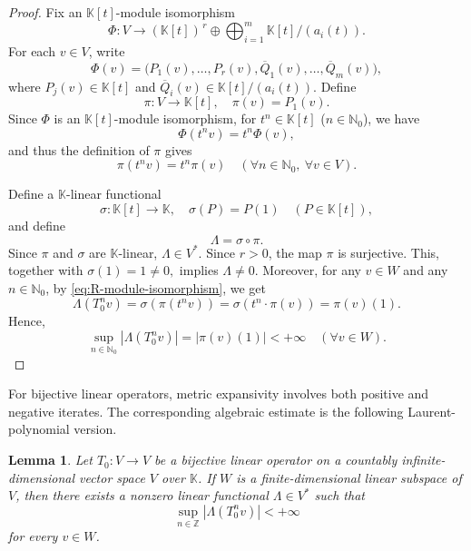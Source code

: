 \documentclass[11pt]{amsart}
\newtheorem{lemma}{Lemma}
\theoremstyle{definition}
\theoremstyle{remark}
\theoremstyle{plain}
\begin{document}
\begin{proof}
Fix an \(\mathbb{K}[t]\)-module isomorphism
\[
\Phi:V\to (\mathbb{K}[t])^{\,r}
\oplus
\bigoplus_{i=1}^{m}\mathbb{K}[t]\big/(a_i(t)).
\]
For each \(v\in V\), write
\[
\Phi(v)=
\big(P_1(v),\ldots,P_r(v),
\overline{Q}_1(v),\ldots,\overline{Q}_m(v)\big),
\]
where \(P_j(v)\in\mathbb{K}[t]\) and
\(\overline{Q}_i(v)\in\mathbb{K}[t]\big/(a_i(t))\).
Define
\[
\pi:V\to\mathbb{K}[t],
\quad
\pi(v)=P_1(v).
\]
Since \(\Phi\) is an \(\mathbb{K}[t]\)-module isomorphism,
for $t^{n}\in \mathbb{K}[t]$ ($n\in \mathbb{N}_0$), we have
\[
\Phi(t^n v)=t^n\Phi(v),
\]
and thus the definition of \(\pi\) gives
\begin{equation}\label{eq:R-module-isomorphism}
\pi(t^n v)
=
t^n\pi(v)
\quad(\forall n\in\mathbb{N}_0,\ \forall v\in V).
\end{equation}

Define a \(\mathbb{K}\)-linear functional
\[
\sigma:\mathbb{K}[t]\to\mathbb{K},
\quad
\sigma(P)=P(1)
\quad(P\in\mathbb{K}[t]),
\]
and define
\[
\Lambda=\sigma\circ\pi.
\]
Since \(\pi\) and \(\sigma\) are \(\mathbb{K}\)-linear, \(\Lambda\in V^*\).
Since \(r>0\), the map \(\pi\) is surjective.
This, together with \(\sigma(1)=1\ne0,\)
implies \(\Lambda\ne0.\)
Moreover, for any
\(v\in W\) and any \(n\in\mathbb{N}_0\),
by \eqref{eq:R-module-isomorphism}, we get
\[
\Lambda(T_0^nv)
=\sigma(\pi(t^n v))
=\sigma(t^n\cdot \pi(v))
=\pi(v)(1).
\]
Hence,
\[
\sup_{n\in\mathbb{N}_0}
|\Lambda(T_0^nv)|
=
|\pi(v)(1)|
<
+\infty \quad (\forall v\in W).
\]
\end{proof}

For bijective linear operators, metric expansivity involves both positive and negative
iterates.  The corresponding algebraic estimate is the following
Laurent-polynomial version.

\begin{lemma}\label{lem:bounded-two-sided-orbit-functionals}
Let \(T_0:V\to V\) be a bijective linear operator on a countably
infinite-dimensional vector space \(V\) over \(\mathbb{K}\).
If \(W\) is a finite-dimensional linear subspace of
\(V\), then there exists a nonzero linear functional \(\Lambda\in V^*\) such that
\[
\sup_{n\in\mathbb{Z}}|\Lambda(T_0^n v)|<+\infty
\]
for every \(v\in W\).
\end{lemma}
\end{document}

